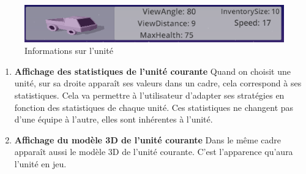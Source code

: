 \documentclass{report}
\begin{document}
\begin{figure}[h]
	\centering
		\includegraphics[scale=1]{StatsModel}
	\caption{Informations sur l'unité}
\end{figure}

\begin{enumerate}[label=\Alph*)]
\item\textbf{Affichage des statistiques de l'unité courante} \newline
Quand on choisit une unité, sur sa droite apparaît ses valeurs dans un cadre, cela correspond à ses statistiques. Cela va permettre à l'utilisateur d'adapter ses stratégies en fonction des statistiques de chaque unité.
Ces statistiques ne changent pas d'une équipe à l'autre, elles sont inhérentes à l'unité.
\item\textbf{Affichage du modèle 3D de l'unité courante} \newline
Dans le même cadre apparaît aussi le modèle 3D de l'unité courante. C'est l'apparence qu'aura l'unité en jeu.
\end{enumerate}


\end{document}
